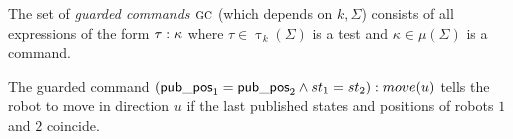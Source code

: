 
%
%
The set of {\em guarded commands $\textsc{gc}$} (which depends on $k,\Sigma$) consists of all expressions of the
form $\tau:\kappa$ where $\tau \in \uptau_k(\Sigma)$ is a test and $\kappa \in \mu(\Sigma)$ is a command.

\begin{example}
The guarded command $(\mathsf{pub\_pos}_1 = \mathsf{pub\_pos}_2 \wedge st_1 = st_2):move(u)$
tells the robot to move in direction $u$ if the last published states and positions of robots $1$ and $2$ coincide.
\end{example}





%


